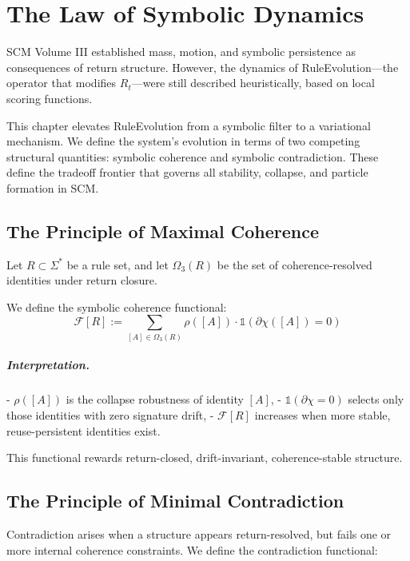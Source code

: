 \chapter{The Law of Symbolic Dynamics} \label{chapter-variational-law}

SCM Volume III established mass, motion, and symbolic persistence as consequences of return structure. However, the dynamics of RuleEvolution—the operator that modifies $R_t$—were still described heuristically, based on local scoring functions.

This chapter elevates RuleEvolution from a symbolic filter to a variational mechanism. We define the system’s evolution in terms of two competing structural quantities: symbolic coherence and symbolic contradiction. These define the tradeoff frontier that governs all stability, collapse, and particle formation in SCM.

\section{The Principle of Maximal Coherence} \label{sec:maximal-coherence}

Let $R \subset \Sigma^*$ be a rule set, and let $\Omega_3(R)$ be the set of coherence-resolved identities under return closure.

We define the symbolic coherence functional:
\begin{equation} \label{eq:coherence-functional}
\mathcal{F}[R] := \sum_{[A] \in \Omega_3(R)} \rho([A]) \cdot \mathbb{1}(\partial\chi([A]) = 0)
\end{equation}

\paragraph{Interpretation.}
- $\rho([A])$ is the collapse robustness of identity $[A]$,
- $\mathbb{1}(\partial\chi = 0)$ selects only those identities with zero signature drift,
- $\mathcal{F}[R]$ increases when more stable, reuse-persistent identities exist.

This functional rewards return-closed, drift-invariant, coherence-stable structure.

\section{The Principle of Minimal Contradiction} \label{sec:minimal-contradiction}

Contradiction arises when a structure appears return-resolved, but fails one or more internal coherence constraints. We define the contradiction functional:

